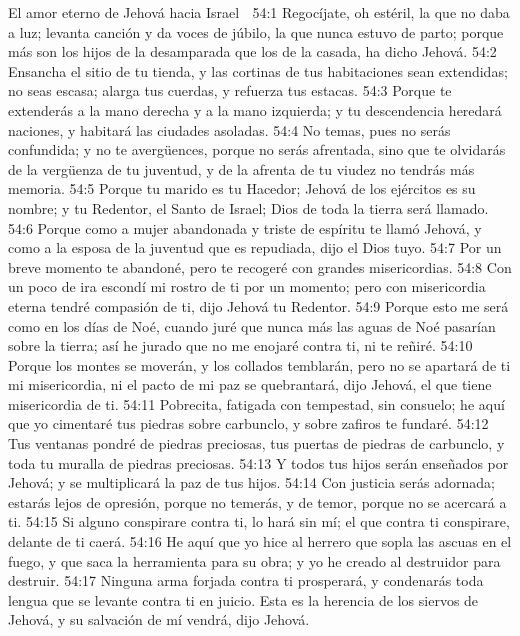 El amor eterno de Jehová hacia Israel  

54:1 Regocíjate, oh estéril, la que no daba a luz; levanta canción y da voces de júbilo, la que nunca estuvo de parto; porque más son los hijos de la desamparada que los de la casada, ha dicho Jehová.  
54:2 Ensancha el sitio de tu tienda, y las cortinas de tus habitaciones sean extendidas; no seas escasa; alarga tus cuerdas, y refuerza tus estacas.  
54:3 Porque te extenderás a la mano derecha y a la mano izquierda; y tu descendencia heredará naciones, y habitará las ciudades asoladas.  
54:4 No temas, pues no serás confundida; y no te avergüences, porque no serás afrentada, sino que te olvidarás de la vergüenza de tu juventud, y de la afrenta de tu viudez no tendrás más memoria.  
54:5 Porque tu marido es tu Hacedor; Jehová de los ejércitos es su nombre; y tu Redentor, el Santo de Israel; Dios de toda la tierra será llamado.  
54:6 Porque como a mujer abandonada y triste de espíritu te llamó Jehová, y como a la esposa de la juventud que es repudiada, dijo el Dios tuyo.  
54:7 Por un breve momento te abandoné, pero te recogeré con grandes misericordias.  
54:8 Con un poco de ira escondí mi rostro de ti por un momento; pero con misericordia eterna tendré compasión de ti, dijo Jehová tu Redentor.  
54:9 Porque esto me será como en los días de Noé, cuando juré que nunca más las aguas de Noé pasarían sobre la tierra; así he jurado que no me enojaré contra ti, ni te reñiré.  
54:10 Porque los montes se moverán, y los collados temblarán, pero no se apartará de ti mi misericordia, ni el pacto de mi paz se quebrantará, dijo Jehová, el que tiene misericordia de ti.  
54:11 Pobrecita, fatigada con tempestad, sin consuelo; he aquí que yo cimentaré tus piedras sobre carbunclo, y sobre zafiros te fundaré.  
54:12 Tus ventanas pondré de piedras preciosas, tus puertas de piedras de carbunclo, y toda tu muralla de piedras preciosas. 
54:13 Y todos tus hijos serán enseñados por Jehová; y se multiplicará la paz de tus hijos.  
54:14 Con justicia serás adornada; estarás lejos de opresión, porque no temerás, y de temor, porque no se acercará a ti.  
54:15 Si alguno conspirare contra ti, lo hará sin mí; el que contra ti conspirare, delante de ti caerá.  
54:16 He aquí que yo hice al herrero que sopla las ascuas en el fuego, y que saca la herramienta para su obra; y yo he creado al destruidor para destruir.  
54:17 Ninguna arma forjada contra ti prosperará, y condenarás toda lengua que se levante contra ti en juicio. Esta es la herencia de los siervos de Jehová, y su salvación de mí vendrá, dijo Jehová.  


